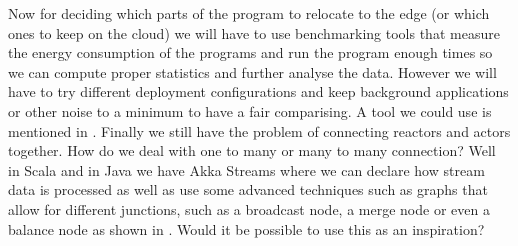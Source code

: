 \documentclass[a4paper]{article}
\begin{document}
Now for deciding which parts of the program to relocate to the edge (or which ones to keep on the cloud) we will have to use benchmarking tools that measure the energy consumption of the programs and run the program enough times so we can compute proper statistics and further analyse the data. However we will have to try different deployment configurations and keep background applications or other noise to a minimum to have a fair comparising. A tool we could use is mentioned in \cite{cruz2021tools}. \newline\newline
Finally we still have the problem of connecting reactors and actors together. How do we deal with one to many or many to many connection? Well in Scala and in Java we have Akka Streams where we can declare how stream data is processed as well as use some advanced techniques such as graphs that allow for different junctions, such as a broadcast node, a merge node or even a balance node as shown in \cite{AkkaStream}. Would it be possible to use this as an inspiration?
\newpage
\end{document}

